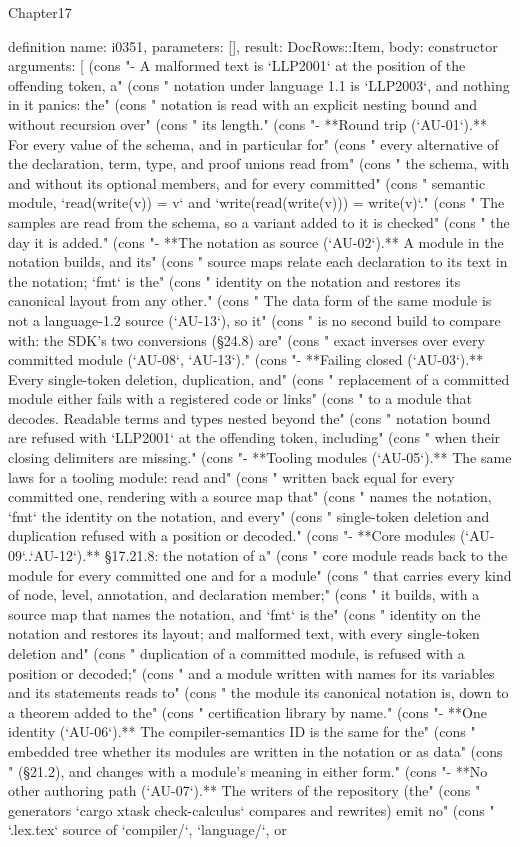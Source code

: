 \begin{lexlean}{Chapter17}
\begin{semanticmodule}
definition{
  name: i0351,
  parameters: [],
  result: DocRows::Item,
  body: constructor{
    arguments: [
      (cons "- A malformed text is `LLP2001` at the position of the offending token, a" (cons "  notation under language 1.1 is `LLP2003`, and nothing in it panics: the" (cons "  notation is read with an explicit nesting bound and without recursion over" (cons "  its length." (cons "- **Round trip (`AU-01`).** For every value of the schema, and in particular for" (cons "  every alternative of the declaration, term, type, and proof unions read from" (cons "  the schema, with and without its optional members, and for every committed" (cons "  semantic module, `read(write(v)) = v` and `write(read(write(v))) = write(v)`." (cons "  The samples are read from the schema, so a variant added to it is checked" (cons "  the day it is added." (cons "- **The notation as source (`AU-02`).** A module in the notation builds, and its" (cons "  source maps relate each declaration to its text in the notation; `fmt` is the" (cons "  identity on the notation and restores its canonical layout from any other." (cons "  The data form of the same module is not a language-1.2 source (`AU-13`), so it" (cons "  is no second build to compare with: the SDK's two conversions (§24.8) are" (cons "  exact inverses over every committed module (`AU-08`, `AU-13`)." (cons "- **Failing closed (`AU-03`).** Every single-token deletion, duplication, and" (cons "  replacement of a committed module either fails with a registered code or links" (cons "  to a module that decodes. Readable terms and types nested beyond the" (cons "  notation bound are refused with `LLP2001` at the offending token, including" (cons "  when their closing delimiters are missing." (cons "- **Tooling modules (`AU-05`).** The same laws for a tooling module: read and" (cons "  written back equal for every committed one, rendering with a source map that" (cons "  names the notation, `fmt` the identity on the notation, and every" (cons "  single-token deletion and duplication refused with a position or decoded." (cons "- **Core modules (`AU-09`..`AU-12`).** §17.21.8: the notation of a" (cons "  core module reads back to the module for every committed one and for a module" (cons "  that carries every kind of node, level, annotation, and declaration member;" (cons "  it builds, with a source map that names the notation, and `fmt` is the" (cons "  identity on the notation and restores its layout; and malformed text, with every single-token deletion and" (cons "  duplication of a committed module, is refused with a position or decoded;" (cons "  and a module written with names for its variables and its statements reads to" (cons "  the module its canonical notation is, down to a theorem added to the" (cons "  certification library by name." (cons "- **One identity (`AU-06`).** The compiler-semantics ID is the same for the" (cons "  embedded tree whether its modules are written in the notation or as data" (cons "  (§21.2), and changes with a module's meaning in either form." (cons "- **No other authoring path (`AU-07`).** The writers of the repository (the" (cons "  generators `cargo xtask check-calculus` compares and rewrites) emit no" (cons "  `.lex.tex` source of `compiler/`, `language/`, or }}
\end{semanticmodule}
\end{lexlean}
